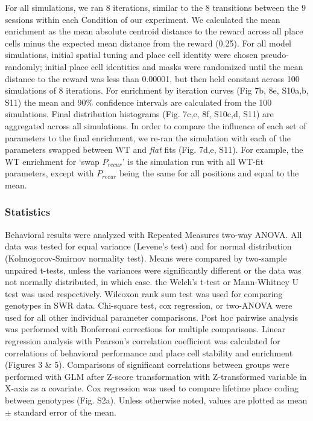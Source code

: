 For all simulations, we ran 8 iterations, similar to the 8 transitions between the 9 sessions within each Condition of our experiment. We calculated the mean enrichment as the mean absolute centroid distance to the reward across all place cells minus the expected mean distance from the reward (0.25). For all model simulations, initial spatial tuning and place cell identity were chosen pseudo-randomly; initial place cell identities and masks were randomized until the mean distance to the reward was less than 0.00001, but then held constant across 100 simulations of 8 iterations. For enrichment by iteration curves (Fig 7b, 8e, S10a,b, S11) the mean and 90\% confidence intervals are calculated from the 100 simulations. Final distribution histograms (Fig. 7c,e, 8f, S10c,d, S11) are aggregated across all simulations. In order to compare the influence of each set of parameters to the final enrichment, we re-ran the simulation with each of the parameters swapped between WT and \emph{flat} fits (Fig. 7d,e, S11). For example, the WT enrichment for `swap $P_{recur}$' is the simulation run with all WT-fit parameters, except with $P_{recur}$ being the same for all positions and equal to the mean.

\subsubsection{Statistics}
Behavioral results were analyzed with Repeated Measures two-way ANOVA. All data was tested for equal variance (Levene's test) and for normal distribution (Kolmogorov-Smirnov normality test). Means were compared by two-sample unpaired t-tests, unless the variances were significantly different or the data was not normally distributed, in which case. the Welch's t-test or Mann-Whitney U test was used respectively. Wilcoxon rank sum test was used for comparing genotypes in SWR data. Chi-square test, cox regression, or two-ANOVA were used for all other individual parameter comparisons. Post hoc pairwise analysis was performed with Bonferroni corrections for multiple comparisons. Linear regression analysis with Pearson's correlation coefficient was calculated for correlations of behavioral performance and place cell stability and enrichment (Figures 3 \& 5). Comparisons of significant correlations between groups were performed with GLM after Z-score transformation with Z-transformed variable in X-axis as a covariate. Cox regression was used to compare lifetime place coding between genotypes (Fig. S2a). Unless otherwise noted, values are plotted as mean $\pm$ standard error of the mean.
